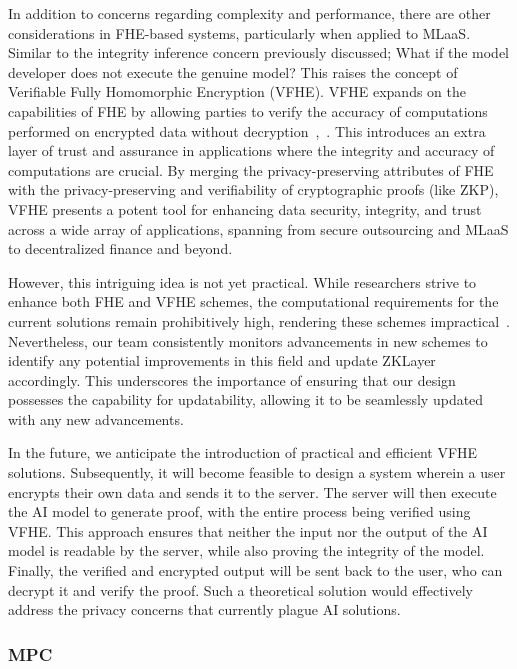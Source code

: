 \documentclass[conference]{IEEEtran}
\begin{document}
In addition to concerns regarding complexity and performance, there are other considerations in FHE-based systems, particularly when applied to MLaaS. Similar to the integrity inference concern previously discussed; What if the model developer does not execute the genuine model? This raises the concept of Verifiable Fully Homomorphic Encryption (VFHE). VFHE expands on the capabilities of FHE by allowing parties to verify the accuracy of computations performed on encrypted data without decryption~\cite{Viand2023VerifiableFH},~\cite{Chatel2022VerifiableEF}. This introduces an extra layer of trust and assurance in applications where the integrity and accuracy of computations are crucial. By merging the privacy-preserving attributes of FHE with the privacy-preserving and verifiability of cryptographic proofs (like ZKP), VFHE presents a potent tool for enhancing data security, integrity, and trust across a wide array of applications, spanning from secure outsourcing and MLaaS to decentralized finance and beyond.

However, this intriguing idea is not yet practical. While researchers strive to enhance both FHE and VFHE schemes, the computational requirements for the current solutions remain prohibitively high, rendering these schemes impractical~\cite{Atapoor2024VerifiableFV}. Nevertheless, our team consistently monitors advancements in new schemes to identify any potential improvements in this field and update ZKLayer accordingly. This underscores the importance of ensuring that our design possesses the capability for updatability, allowing it to be seamlessly updated with any new advancements.

In the future, we anticipate the introduction of practical and efficient VFHE solutions. Subsequently, it will become feasible to design a system wherein a user encrypts their own data and sends it to the server. The server will then execute the AI model to generate proof, with the entire process being verified using VFHE. This approach ensures that neither the input nor the output of the AI model is readable by the server, while also proving the integrity of the model. Finally, the verified and encrypted output will be sent back to the user, who can decrypt it and verify the proof. Such a theoretical solution would effectively address the privacy concerns that currently plague AI solutions.


\subsubsection{MPC}
\end{document}
